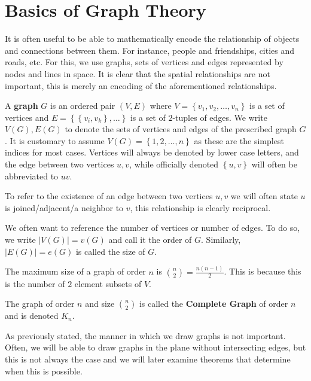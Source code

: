 \section{Basics of Graph Theory}
It is often useful to be able to mathematically encode the relationship of objects and connections between them. For instance, people and friendships, cities and roads, etc. For this, we use graphs, sets of vertices and edges represented by nodes and lines in space. It is clear that the spatial relationships are not important, this is merely an encoding of the aforementioned relationships.
\begin{definition}[Graph]
	A \textbf{graph} $G$ is an ordered pair $\left( V, E \right) $ where $V = \left\{ v_1, v_2, \ldots, v_{n} \right\}$ is a set of vertices and $E = \left\{ \left\{ v_{i}, v_{k} \right\}, \ldots \right\}  $  is a set of $2$-tuples of edges. We write $V\left( G \right), E\left( G \right)$ to denote the sets of vertices and edges of the prescribed graph $G$. It is customary to assume $V\left( G \right) = \left\{ 1, 2, \ldots, n \right\} $ as these are the simplest indices for most cases. Vertices will always be denoted by lower case letters, and the edge between two vertices $u, v$, while officially denoted $\left\{ u,v \right\} $ will often be abbreviated to $uv$.
\end{definition}
To refer to the existence of an edge between two vertices $u, v$ we will often state $u$ is joined/adjacent/a neighbor to $v$, this relationship is clearly reciprocal.
 \begin{notation}
	 We often want to reference the number of vertices or number of edges. To do so, we write  $ \left| V\left( G \right)  \right| = v\left( G \right) $ and call it the order of $G$. Similarly, $ \left| E\left( G \right)  \right| = e\left( G \right) $ is called the size of $G$.
\end{notation}
\begin{proposition}
	The maximum size of a graph of order $n$ is $\binom{n}{2} = \frac{n\left( n-1 \right) }{2}$. This is because this is the number of $2$ element subsets of $V$.
\end{proposition}
\begin{definition}
	The graph of order $n$ and size $\binom{n}{2}$ is called the  \textbf{Complete Graph} of order $n$ and is denoted $K_{n}$.
\end{definition}
As previously stated, the manner in which we draw graphs is not important. Often, we will be able to draw graphs in the plane without intersecting edges, but this is not always the case and we will later examine theorems that determine when this is possible.
